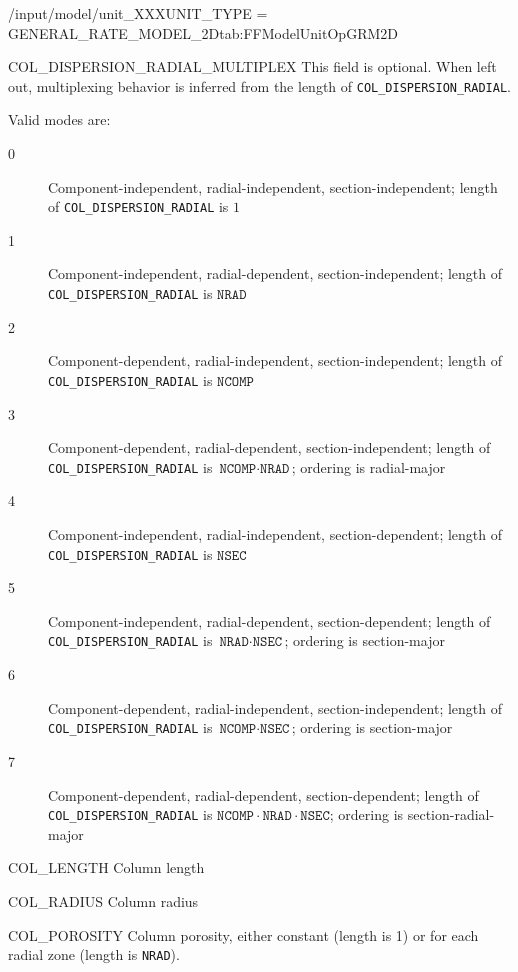 \begin{condsubgroup}{/input/model/unit\_XXX}{UNIT\_TYPE = GENERAL\_RATE\_MODEL\_2D}{tab:FFModelUnitOpGRM2D}
\begin{dataset}[unit=--,type=int,range={$\{0, \dots, 7 \}$},length={1}]{COL\_DISPERSION\_RADIAL\_MULTIPLEX}
    This field is optional.
    When left out, multiplexing behavior is inferred from the length of \texttt{COL\_DISPERSION\_RADIAL}.

    Valid modes are:
    \begin{description}
      \item[0] Component-independent, radial-independent, section-independent; length of \texttt{COL\_DISPERSION\_RADIAL} is $1$
      \item[1] Component-independent, radial-dependent, section-independent; length of \texttt{COL\_DISPERSION\_RADIAL} is $\texttt{NRAD}$
      \item[2] Component-dependent, radial-independent, section-independent; length of \texttt{COL\_DISPERSION\_RADIAL} is $\texttt{NCOMP}$
      \item[3] Component-dependent, radial-dependent, section-independent; length of \texttt{COL\_DISPERSION\_RADIAL} is $\texttt{NCOMP} \cdot \texttt{NRAD}$; ordering is radial-major
      \item[4] Component-independent, radial-independent, section-dependent; length of \texttt{COL\_DISPERSION\_RADIAL} is $\texttt{NSEC}$
      \item[5] Component-independent, radial-dependent, section-dependent; length of \texttt{COL\_DISPERSION\_RADIAL} is $\texttt{NRAD} \cdot \texttt{NSEC}$; ordering is section-major
      \item[6] Component-dependent, radial-independent, section-independent; length of \texttt{COL\_DISPERSION\_RADIAL} is $\texttt{NCOMP} \cdot \texttt{NSEC}$; ordering is section-major
      \item[7] Component-dependent, radial-dependent, section-dependent; length of \texttt{COL\_DISPERSION\_RADIAL} is $\texttt{NCOMP} \cdot \texttt{NRAD} \cdot \texttt{NSEC}$; ordering is section-radial-major
    \end{description}\vspace{-\baselineskip}
  \end{dataset}
  \begin{dataset}[unit=\si{\metre},type=double,range={$> 0$},length={1}]{COL\_LENGTH}
    Column length
  \end{dataset}
  \begin{dataset}[unit=\si{\metre},type=double,range={$> 0$},length={1}]{COL\_RADIUS}
    Column radius
  \end{dataset}
  \begin{dataset}[unit=--,type=double,range={$(0,1]$},length={$1$ / \texttt{NRAD}}]{COL\_POROSITY}
    Column porosity, either constant (length is 1) or for each radial zone (length is \texttt{NRAD}).


\end{dataset}
\end{condsubgroup}
